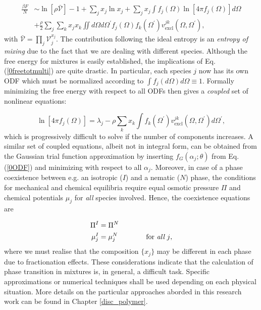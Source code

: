 {\begin{align}
\frac{\beta F}{N} &\sim \ln [\rho \mathcal{\bar{V}}]-1 + \sum_{j} x_{j} \ln x_{j} +
\sum_{j} x_{j} \int f_{j}(\Omega)\ln \left[ 4 \pi f_{j}(\Omega) \right] d \Omega \nonumber \\
&+\frac{\rho}{2}\sum_{j}\sum_{k}x_{j}x_{k} \iint  d \Omega d\Omega^{\prime}
f_{j}(\Omega)f_{k}(\Omega^{\prime})
v_{\text{excl}}^{jk}(\Omega,\Omega^{\prime}),  \label{0freetotmulti}
\end{align}
with $\mathcal{\bar{V}}=\prod_{j}\mathcal{V}_{j}^{x_{j}}$. The contribution following the ideal entropy is an {\em entropy of mixing} due to the fact that we are dealing with different species. Although the free energy for mixtures is easily established,  the implications of Eq. (\ref{0freetotmulti}) are quite drastic. In particular, each species $j$ now has its own ODF which must be normalized according to $\int f_{j}(d\Omega)d\Omega \equiv 1$. Formally minimizing the free energy with respect to all ODFs then gives a {\em coupled} set of nonlinear equations:

\begin{equation}
\ln[4\pi f_{j}(\Omega)]=\lambda_{j} - \rho \sum_{k} x_{k} \int f_{k}(\Omega^{\prime})v_{\text{excl}}^{jk}(\Omega,\Omega^{\prime})
d\Omega^{\prime}, \label{0inteqmulti}
\end{equation}
which  is  progressively difficult to solve if the number of components increases. A similar set of coupled equations, albeit not in integral form, can be obtained from the Gaussian trial function approximation by inserting $f_{G}(\alpha_{j};\theta)$ from Eq. (\ref{0ODF}) and minimizing with respect to all $\alpha_{j}$. Moreover, in case of a phase coexistence between e.g. an isotropic ($I$) and a nematic ($N$) phase, the conditions for mechanical and chemical equilibria require equal osmotic pressure $\Pi$ and chemical potentials $\mu_{j}$ for {\em all} species involved. Hence, the coexistence equations are

\begin{align}
\Pi^{I}&=\Pi^{N} \nonumber \\
\mu^{I}_{j}&=\mu^{N}_{j} \qquad\qquad \text{for {\em all} $j$},
\end{align}
where we must realise that the composition $\{x_{j}\}$ may be different in each phase due to fractionation effects. These considerations indicate that the calculation of phase transition in mixtures is, in general, a difficult task. Specific approximations or numerical techniques shall be used depending on each physical situation. More details on the particular approaches aborded in this research work can be found in Chapter \ref{disc_polymer}.
}

